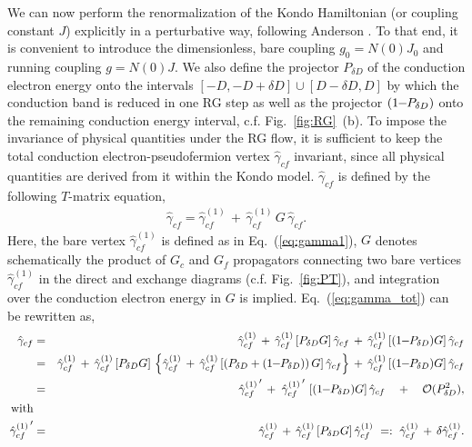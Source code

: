 \documentclass[12pt,twoside]{article}
\newcommand{\Eq}[1]{Eq.~(\ref{#1})}
\begin{document}
We can now perform the renormalization of the Kondo Hamiltonian 
(or coupling constant $J$) explicitly in a perturbative way, 
 following Anderson \cite{Anderson70}.
To that end, it is convenient to introduce the dimensionless, 
bare coupling $g_0=N(0)J_0$ and running coupling $g=N(0)J$. 
We also define the projector $P_{\delta D}$ of the conduction electron 
energy onto the intervals $[-D,-D+\delta D] \cup [D-\delta D,D]$ 
by which the conduction band is reduced in one RG step as well as the projector 
$(1\hspace*{-0.1cm}-\hspace*{-0.1cm}P_{\delta D})$ onto the 
remaining conduction energy interval, c.f. Fig.~\ref{fig:RG}~(b). 
To impose the invariance of physical 
quantities under the RG flow, it is sufficient to keep the total 
conduction electron-pseudofermion vertex $\hat\gamma_{cf}$ invariant,
since all physical quantities are derived from it within the Kondo model. 
$\hat\gamma_{cf}$ is defined by the following $T$-matrix equation,
\begin{eqnarray}
\hat\gamma_{cf} = 
\hat\gamma_{cf}^{(1)}\,+\,\hat\gamma_{cf}^{(1)}\,G\,\hat\gamma_{cf} .
\label{eq:gamma_tot}
\end{eqnarray}
Here, the bare vertex $\hat\gamma_{cf}^{(1)}$ is defined as in \Eq{eq:gamma1},
$G$ denotes schematically the product of 
$G_c$ and $G_f$ propagators connecting two bare vertices $\hat\gamma_{cf}^{(1)}$
in the direct and exchange diagrams (c.f. Fig.~\ref{fig:PT}), 
and integration over the conduction electron energy in $G$ is 
implied. \Eq{eq:gamma_tot} can be rewritten as,
\begin{eqnarray}
\hat\gamma_{cf} &=& \hat\gamma_{cf}^{(1)}
\,+\,\hat\gamma_{cf}^{(1)}\,[P_{\delta D}G]\,\hat\gamma_{cf} 
\,+\,\hat\gamma_{cf}^{(1)}\,[(1\hspace*{-0.1cm}-\hspace*{-0.1cm}P_{\delta D})G]\,\hat\gamma_{cf} \label{eq:gamma_tot_renorm}\\
&=& \hat\gamma_{cf}^{(1)}
\,+\,\hat\gamma_{cf}^{(1)}\,[P_{\delta D}G]\,
\left\{\hat\gamma_{cf}^{(1)} 
\,+\,\hat\gamma_{cf}^{(1)}\,[\left(P_{\delta D}+(1\hspace*{-0.1cm}-\hspace*{-0.1cm}P_{\delta D})\right)G]\,\hat\gamma_{cf}\right\} 
\,+\,\hat\gamma_{cf}^{(1)}\,[(1\hspace*{-0.1cm}-\hspace*{-0.1cm}P_{\delta D})G]\,\hat\gamma_{cf}\nonumber \\
&=& \left.\hat\gamma_{cf}^{(1)}\right. ' 
\,+\,\left.\hat\gamma_{cf}^{(1)}\right. '\,
[(1\hspace*{-0.1cm}-\hspace*{-0.1cm}P_{\delta D})G]\,\hat\gamma_{cf} \quad +\quad {\cal O}(P_{\delta D}^2), \nonumber \\
\mathrm{with}\hfill && \nonumber\\
\left.\hat\gamma_{cf}^{(1)}\right. '  &=&  \hat\gamma_{cf}^{(1)}
\,+\,\hat\gamma_{cf}^{(1)}\,[P_{\delta D}G]\,\hat\gamma_{cf}^{(1)} \ =:\ 
\hat\gamma_{cf}^{(1)}\,+\,\delta\hat\gamma_{cf}^{(1)}.
\label{eq:gamma_bare_renorm}
\end{eqnarray}
\end{document}
